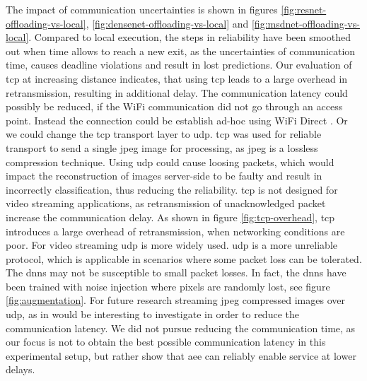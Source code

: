 The impact of communication uncertainties is shown in figures \ref{fig:resnet-offloading-vs-local}, \ref{fig:densenet-offloading-vs-local} and \ref{fig:msdnet-offloading-vs-local}. Compared to local execution, the steps in reliability have been smoothed out when time allows to reach a new exit, as the uncertainties of communication time, causes deadline violations and result in lost predictions. Our evaluation of \gls{tcp} at increasing distance indicates, that using \gls{tcp} leads to a large overhead in retransmission, resulting in additional delay. The communication latency could possibly be reduced, if the WiFi communication did not go through an access point. Instead the connection could be establish ad-hoc using WiFi Direct \cite{noauthor_wi-fi_nodate}. Or we could change the \gls{tcp} transport layer to \gls{udp}. \gls{tcp} was used for reliable transport to send a single jpeg image for processing, as jpeg is a lossless compression technique. Using \gls{udp} could cause loosing packets, which would impact the reconstruction of images server-side to be faulty and result in incorrectly classification, thus reducing the reliability. \gls{tcp} is not designed for video streaming applications, as retransmission of unacknowledged packet increase the communication delay. As shown in figure \ref{fig:tcp-overhead}, \gls{tcp} introduces a large overhead of retransmission, when networking conditions are poor. For video streaming \gls{udp} is more widely used. \gls{udp} is a more unreliable protocol, which is applicable in scenarios where some packet loss can be tolerated. The \gls{dnn}s may not be susceptible to small packet losses. In fact, the \gls{dnn}s have been trained with noise injection where pixels are randomly lost, see figure \ref{fig:augmentation}. For future research streaming jpeg compressed images over \gls{udp}, as in \cite{liu_maximizing_2019} would be interesting to investigate in order to reduce the communication latency. We did not pursue reducing the communication time, as our focus is not to obtain the best possible communication latency in this experimental setup, but rather show that \gls{aee} can reliably enable service at lower delays. 

